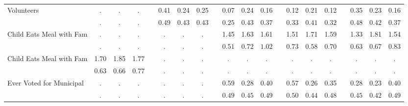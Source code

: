 \begin{center}
{\begin{longtable}{L{5cm} c c c p{.5cm} c c c p{.5cm} c c c p{.5cm} c c c p{.5cm} c c c}
 \quad Volunteers & . &         . &         . & &      0.41 &      0.24 &      0.25 & &      0.07 &      0.24 &      0.16 & &      0.12 &      0.21 &      0.12 & &      0.35 &      0.23 &      0.16 \\*
 \quad & $\mathit{        .}$ & $\mathit{        .}$ & $\mathit{        .}$ & & $\mathit{     0.49}$ & $\mathit{     0.43}$ & $\mathit{     0.43}$ & & $\mathit{     0.25}$ & $\mathit{     0.43}$ & $\mathit{     0.37}$ & & $\mathit{     0.33}$ & $\mathit{     0.41}$ & $\mathit{     0.32}$ & & $\mathit{     0.48}$ & $\mathit{     0.42}$ & $\mathit{     0.37}$ \\[.2em]
 \quad Child Eats Meal with Fam & . &         . &         . & &         . &         . &         . & &      1.45 &      1.63 &      1.61 & &      1.51 &      1.71 &      1.59 & &      1.33 &      1.81 &      1.54 \\*
 \quad & $\mathit{        .}$ & $\mathit{        .}$ & $\mathit{        .}$ & & $\mathit{        .}$ & $\mathit{        .}$ & $\mathit{        .}$ & & $\mathit{     0.51}$ & $\mathit{     0.72}$ & $\mathit{     1.02}$ & & $\mathit{     0.73}$ & $\mathit{     0.58}$ & $\mathit{     0.70}$ & & $\mathit{     0.63}$ & $\mathit{     0.67}$ & $\mathit{     0.83}$ \\[.2em]
 \quad Child Eats Meal with Fam & 1.70 &      1.85 &      1.77 & &         . &         . &         . & &         . &         . &         . & &         . &         . &         . & &         . &         . &         . \\*
 \quad & $\mathit{     0.63}$ & $\mathit{     0.66}$ & $\mathit{     0.77}$ & & $\mathit{        .}$ & $\mathit{        .}$ & $\mathit{        .}$ & & $\mathit{        .}$ & $\mathit{        .}$ & $\mathit{        .}$ & & $\mathit{        .}$ & $\mathit{        .}$ & $\mathit{        .}$ & & $\mathit{        .}$ & $\mathit{        .}$ & $\mathit{        .}$ \\[.2em]
 \quad Ever Voted for Municipal & . &         . &         . & &         . &         . &         . & &      0.59 &      0.28 &      0.40 & &      0.57 &      0.26 &      0.35 & &      0.28 &      0.23 &      0.40 \\*
 \quad & $\mathit{        .}$ & $\mathit{        .}$ & $\mathit{        .}$ & & $\mathit{        .}$ & $\mathit{        .}$ & $\mathit{        .}$ & & $\mathit{     0.49}$ & $\mathit{     0.45}$ & $\mathit{     0.49}$ & & $\mathit{     0.50}$ & $\mathit{     0.44}$ & $\mathit{     0.48}$ & & $\mathit{     0.45}$ & $\mathit{     0.42}$ & $\mathit{     0.49}$ \\[.2em]

\end{longtable}}
\end{center}
